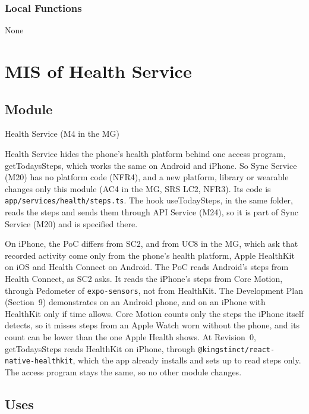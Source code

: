 \documentclass[12pt, titlepage]{article}
\begin{document}
\subsubsection{Local Functions}

None

\par\endgroup

\newpage

\section{MIS of Health Service} \label{MisHealth}

\subsection{Module}

Health Service (M4 in the MG)

\medskip
\noindent Health Service hides the phone's health platform behind one access
program, getTodaysSteps, which works the same on Android and iPhone. So Sync
Service (M20) has no platform code (NFR4), and a new platform, library or
wearable changes only this module (AC4 in the MG, SRS LC2, NFR3). Its code is
\texttt{app/services/health/steps.ts}. The hook useTodaySteps, in the same
folder, reads the steps and sends them through API Service (M24), so it is part
of Sync Service (M20) and is specified there.

\medskip
\noindent On iPhone, the PoC differs from SC2, and from UC8 in the MG, which
ask that recorded activity come only from the phone's health platform, Apple
HealthKit on iOS and Health Connect on Android. The PoC reads Android's steps from Health Connect, as
SC2 asks. It reads the iPhone's steps from Core Motion, through Pedometer of
\texttt{expo-sensors}, not from HealthKit. The Development Plan (Section~9)
demonstrates on an Android phone, and on an iPhone with HealthKit only if time
allows. Core Motion counts only the steps the iPhone itself detects, so it
misses steps from an Apple Watch worn without the phone, and its count can be
lower than the one Apple Health shows. At Revision~0, getTodaysSteps reads
HealthKit on iPhone, through \texttt{@kingstinct/react-native-healthkit}, which
the app already installs and sets up to read steps only. The access program
stays the same, so no other module changes.

\subsection{Uses}
\end{document}
